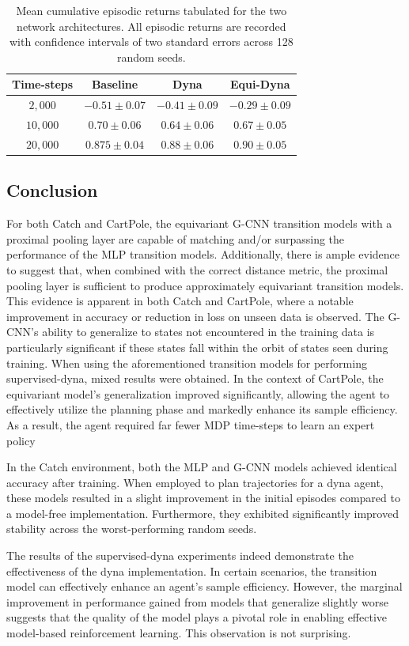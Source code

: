 \begin{table}
	\centering
	\begin{tabular}{|c|c|c|c|}
		\hline
		Time-steps & Baseline         & Dyna             & Equi-Dyna                 \\
		\hline
		$2, 000$   & $- 0.51\pm 0.07$ & $-0.41 \pm 0.09$ & $\mathbf{-0.29\pm 0.09}$  \\
		$10, 000$  & $0.70 \pm 0.06$  & $0.64\pm 0.06 $  & $\mathbf{0.67 \pm 0.05} $ \\
		$20,000$   & $0.875 \pm 0.04$ & $0.88\pm 0.06$   & $\mathbf{0.90\pm 0.05}$   \\
		\hline
	\end{tabular}
	\caption{Mean cumulative episodic returns tabulated for the two network architectures. All episodic returns are recorded with confidence intervals of two standard errors across 128 random seeds.}
	\label{tab:supervised-dyna-catch}
\end{table}

\subsection{Conclusion}
For both Catch and CartPole, the equivariant G-CNN transition models with a proximal pooling layer are capable of matching and/or surpassing the performance of the MLP transition models. Additionally, there is ample evidence to suggest that, when combined with the correct distance metric, the proximal pooling layer is sufficient to produce approximately equivariant transition models. This evidence is apparent in both Catch and CartPole, where a notable improvement in accuracy or reduction in loss on unseen data is observed. The G-CNN's ability to generalize to states not encountered in the training data is particularly significant if these states fall within the orbit of states seen during training.
When using the aforementioned transition models for performing supervised-dyna, mixed results were obtained. In the context of CartPole, the equivariant model's generalization improved significantly, allowing the agent to effectively utilize the planning phase and markedly enhance its sample efficiency. As a result, the agent required far fewer MDP time-steps to learn an expert policy

In the Catch environment, both the MLP and G-CNN models achieved identical accuracy after training. When employed to plan trajectories for a dyna agent, these models resulted in a slight improvement in the initial episodes compared to a model-free implementation. Furthermore, they exhibited significantly improved stability across the worst-performing random seeds.

The results of the supervised-dyna experiments indeed demonstrate the effectiveness of the dyna implementation. In certain scenarios, the transition model can effectively enhance an agent's sample efficiency. However, the marginal improvement in performance gained from models that generalize slightly worse suggests that the quality of the model plays a pivotal role in enabling effective model-based reinforcement learning. This observation is not surprising.
